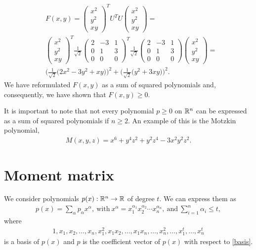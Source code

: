 \documentclass[a4paper,twoside,justified]{tufte-handout}
\begin{document}
\begin{align*}
&F(x,y)=\begin{pmatrix}
x^2\\
y^2\\
xy
\end{pmatrix}^T
U^TU
\begin{pmatrix}
x^2\\
y^2\\
xy
\end{pmatrix}
=\\
&\begin{pmatrix}
x^2\\
y^2\\
xy
\end{pmatrix}^T
\frac{1}{\sqrt{2}}
\begin{pmatrix}
2 & -3 & 1\\
0 & 1 & 3\\
0 & 0 & 0
\end{pmatrix}^T
\frac{1}{\sqrt{2}}
\begin{pmatrix}
2 & -3 & 1\\
0 & 1 & 3\\
0 & 0 & 0
\end{pmatrix}
\begin{pmatrix}
x^2\\
y^2\\
xy
\end{pmatrix}=\\
&\bigg(\frac{1}{\sqrt{2}}\big(2x^2-3y^2+xy\big)\bigg)^2+\bigg(\frac{1}{\sqrt{2}}\big(y^2+3xy\big)\bigg)^2.
\end{align*}
We have reformulated $F(x,y)$ as a sum of squared polynomials and, consequently, we have shown that $F(x,y)\geq0$.

It is important to note that not every polynomial $p\geq 0$ on $\mathbb{R}^n$ can be expressed as a sum of squared polynomials if $n\geq2$. An example of this is the Motzkin polynomial\cite{motzkin1967sos},
\begin{align*}
M(x,y,z)=x^6+y^4z^2+y^2z^4-3x^2y^2z^2.
\end{align*}

\section{Moment matrix\cite{lasserre2001globalOpt}}
We consider polynomials $p(x):\mathbb{R}^n\rightarrow\mathbb{R}$ of degree $t$. We can express them as
\begin{eqnarray*}
p(x)=\sum_{\alpha}p_{\alpha}x^{\alpha},\ \text{with}\   x^{\alpha}=x_1^{\alpha_1}x_2^{\alpha_2}\cdots x_n^{\alpha_n},\ \text{and}\  \sum_{i=1}^n\alpha_i\leq t,
\end{eqnarray*}
where 
\begin{align}
\label{basis}
1,x_1,x_2,\ldots,x_n,x_1^2,x_1x_2,\ldots,x_1x_n,\ldots,x_n^2,\dots,x_1^t,\ldots,x_n^t
\end{align}
is a basis of $p(x)$ and $p$ is the coefficient vector of $p(x)$ with respect to \eqref{basis}. 
\end{document}
